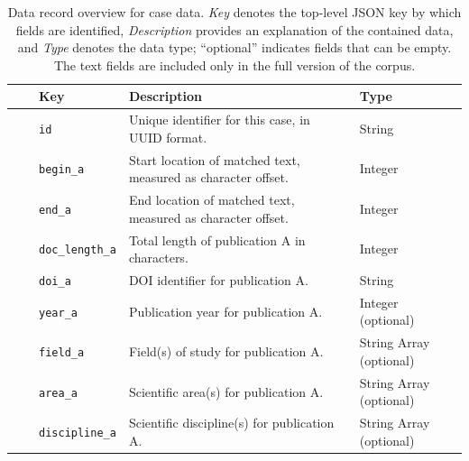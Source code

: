 \begin{table}[ht]
\centering
\small

\caption{Data record overview for case data. \textit{Key} denotes the top-level JSON key by which fields are identified, \textit{Description} provides an explanation of the contained data, and \textit{Type} denotes the data type; ``optional'' indicates fields that can be empty. The text fields are included only in the full version of the corpus.}
\label{tab:data-record-cases}

\begin{tabularx}{\textwidth}{@{}cclXl@{}}
\toprule
& & \textbf{\textsf{Key}} & \textbf{\textsf{Description}} & \textbf{\textsf{Type}} \\

\midrule
& & \texttt{id} & Unique identifier for this case, in UUID format. & String \\

\midrule
\parbox[t]{0.7em}{}

& \parbox[t]{0.7em}{}
& \texttt{begin\_a} & Start location of matched text, measured as character offset.& Integer\\
& & \texttt{end\_a} & End location of matched text, measured as character offset.& Integer\\
& & \texttt{doc\_length\_a} & Total length of publication A in characters. & Integer\\

\cmidrule(l){2-5}
& \parbox[t]{0.7em}{}
& \texttt{doi\_a} & DOI identifier for publication A.& String\\
& & \texttt{year\_a} & Publication year for publication A.& Integer (optional)\\
& & \texttt{field\_a} & Field(s) of study for publication A.& String Array (optional)\\
& & \texttt{area\_a} & Scientific area(s) for publication A. & String Array (optional)\\
& & \texttt{discipline\_a} & Scientific discipline(s) for publication A.& String Array (optional)\\[1.0ex]


\end{tabularx}
\end{table}
